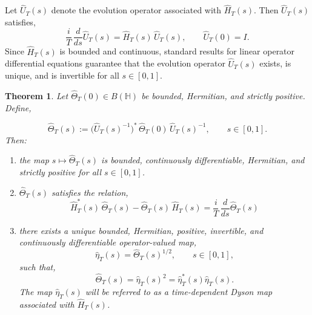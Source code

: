 \documentclass[pdflatex,sn-mathphys-num]{sn-jnl}
\theoremstyle{thmstyleone}
\newtheorem{theorem}{Theorem}
\theoremstyle{thmstyletwo}
\theoremstyle{thmstylethree}
\begin{document}
Let $\hat U_T(s)$ denote the evolution operator associated with $\hat H_T(s)$. Then $\hat U_T(s)$ satisfies,
\begin{equation}\label{2.12a}
 \frac{i}{T}\,\frac{d}{ds}\hat U_T(s)=\hat H_T(s)\,\hat U_T(s),
 \qquad
 \hat U_T(0)=I .
\end{equation}
Since $\hat H_T(s)$ is bounded and continuous, standard results for linear operator
differential equations guarantee that the evolution operator $\hat U_T(s)$ exists,
is unique, and is invertible for all $s\in[0,1]$.

\begin{theorem}\label{thm:DysonExistence}
Let
$\hat\Theta_T(0)\in B(\mathbb{H})$ be bounded, Hermitian, and strictly positive. Define,

\begin{equation}\label{2.12b}
 \hat\Theta_T(s)
 :=
 \big(\hat U_T(s)^{-1}\big)^{*}\,\hat\Theta_T(0)\,\hat U_T(s)^{-1}, \qquad s\in[0,1].
\end{equation}
Then:
\begin{enumerate}
\item the map $s\mapsto\hat\Theta_T(s)$ is bounded, continuously differentiable,
Hermitian, and strictly positive for all $s\in[0,1]$.
\item $\hat\Theta_T(s)$ satisfies the relation,
\begin{equation}\label{2.12}
 \hat H_T^{*}(s)\,\hat\Theta_T(s)-\hat\Theta_T(s)\,\hat H_T(s)
 =
 \frac{i}{T}\,\frac{d}{ds}\hat\Theta_T(s)
\end{equation}
\item there exists a unique bounded, Hermitian, positive, invertible, and continuously
differentiable operator-valued map,
\[
\hat\eta_T(s)=\hat\Theta_T(s)^{1/2},
\qquad s\in[0,1],
\]
such that,
\[
\hat\Theta_T(s)=\hat\eta_T(s)^2
=\hat\eta_T^{*}(s)\hat\eta_T(s).
\]
The map $\hat\eta_T(s)$ will be referred to as a time-dependent Dyson map associated with
$\hat H_T(s)$.
\end{enumerate}
\end{theorem}
\end{document}
